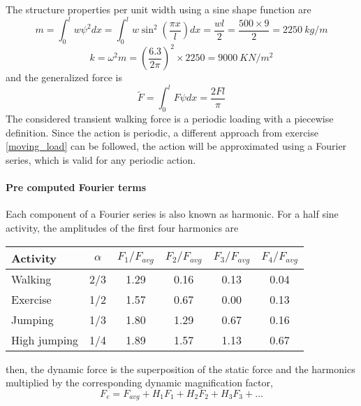 \begin{Answer}[ref={footfall_analysis}]
The structure properties per unit width using a sine shape function are
$$
m = \int_{0}^{l}w\psi^2dx = \int_{0}^{l}w\sin^2\left(\frac{\pi x}{l}\right)dx = \frac{wl}{2} = \frac{500\times9}{2} = \SI{2250}{kg/m}
$$
$$
k = \omega^2m = \left(\frac{6.3}{2\pi}\right)^2\times2250 = \SI{9000}{KN/m^2}
$$
and the generalized force is
$$
\tilde{F} = \int_{0}^{l}F\psi dx = \frac{2Fl}{\pi}
$$
The considered transient walking force is a periodic loading with a piecewise definition. Since the action is periodic, a different approach from exercise \ref{moving_load} can be followed, the action will be approximated using a Fourier series, which is valid for any periodic action.

\paragraph{Pre computed Fourier terms}

Each component of a Fourier series is also known as harmonic. For a half sine activity, the amplitudes of the first four harmonics are

\begin{center}
\begin{tabular}{|l|c|cccc|}
    \hline
    Activity & $\alpha$ & $F_1/F_{avg}$ & $F_2/F_{avg}$ & $F_3/F_{avg}$ & $F_4/F_{avg}$ \\ \hline
    Walking  &    2/3   &   1.29   &   0.16   &   0.13   &   0.04   \\
    Exercise &    1/2   &   1.57   &   0.67   &   0.00   &   0.13   \\
    Jumping  &    1/3   &   1.80   &   1.29   &   0.67   &   0.16   \\
    High jumping & 1/4  &   1.89   &   1.57   &   1.13   &   0.67   \\ \hline
\end{tabular}
\end{center}
then, the dynamic force is the superposition of the static force and the harmonics multiplied by the corresponding dynamic magnification factor,
$$
F_e = F_{avg} + H_1F_1 + H_2F_2 + H_3F_3 + \dots
$$


\end{Answer}
